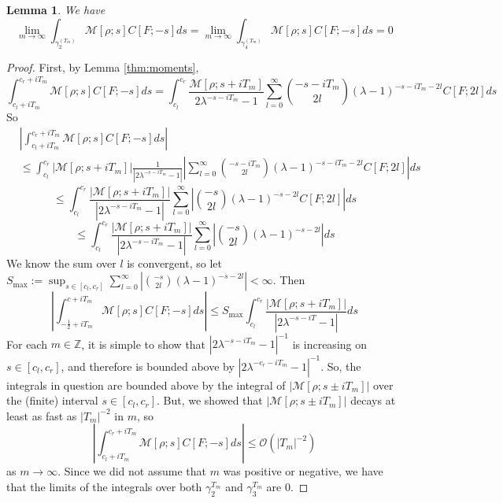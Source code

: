 \documentclass{article}
\newtheorem{lemma}{Lemma}
\newcommand{\tti}{\rightarrow\infty}
\newcommand{\bigO}[1]{\mathcal{O}\left(#1\right)}
\begin{document}
\begin{lemma}
    We have
    \begin{equation}
        \lim_{m \tti}\int_{\gamma_2^{(T_m)}}\mathcal{M}[\rho;s]C[F;-s]ds = \lim_{m \tti}\int_{\gamma_4^{(T_m)}}\mathcal{M}[\rho;s]C[F;-s]ds = 0
    \end{equation}
\end{lemma}
\begin{proof}
    First, by Lemma \ref{thm:moments},
    \begin{equation}
        \int_{c_l+iT_m}^{c_r+iT_m} \mathcal{M}[\rho;s]C[F;-s]ds = \int_{c_l}^{c_r} \frac{\mathcal{M}[\rho;s+iT_m]}{2\lambda^{-s-iT_m}-1}\sum_{l=0}^\infty \binom{-s-iT_m}{2l}(\lambda-1)^{-s-iT_m-2l} C[F; 2l]ds
    \end{equation}
    So
    \begin{align}
        &\left|\int_{c_l+iT_m}^{c_r+iT_m} \mathcal{M}[\rho;s]C[F;-s]ds\right| \nonumber \\ &\leq \int_{c_l}^{c_r} |\mathcal{M}[\rho;s+iT_m]|\frac{1}{|2\lambda^{-s-iT_m}-1|}\left|\sum_{l=0}^\infty \binom{-s-iT_m}{2l}(\lambda-1)^{-s-iT_m-2l} C[F; 2l]\right|ds
    \end{align}
    \begin{equation}
        \leq \int_{c_l}^{c_r} \frac{|\mathcal{M}[\rho;s+iT_m]|}{|2\lambda^{-s-iT_m}-1|}\sum_{l=0}^{\infty}\left|\binom{-s}{2l}(\lambda-1)^{-s-2l} C[F;2l]\right|ds
    \end{equation}
    \begin{equation}
        \leq \int_{c_l}^{c_r} \frac{|\mathcal{M}[\rho;s+iT_m]|}{|2\lambda^{-s-iT_m}-1|}\sum_{l=0}^{\infty}\left|\binom{-s}{2l}(\lambda-1)^{-s-2l}\right| ds
    \end{equation}
    We know the sum over $l$ is convergent, so let $S_{\max} := \sup_{s \in [c_l, c_r]} \sum_{l=0}^{\infty} \left|\binom{-s}{2l}(\lambda-1)^{-s-2l}\right| < \infty$.
    Then
    \begin{equation}
        \left|\int_{-\frac{1}{2}+iT_m}^{c+iT_m} \mathcal{M}[\rho;s]C[F;-s]ds\right| \leq S_{\max}\int_{c_l}^{c_r} \frac{|\mathcal{M}[\rho;s+iT_m]|}{|2\lambda^{-s-iT}-1|}ds
    \end{equation}
    For each $m\in\mathbb{Z}$, it is simple to show that $|2\lambda^{-s-iT_m}-1|^{-1}$ is increasing on $s\in[c_l,c_r]$, and therefore is bounded above by $|2\lambda^{-c_r-iT_m}-1|^{-1}$. So, the integrals in question are bounded above by the integral of $|\mathcal{M}[\rho; s \pm iT_m]|$ over the (finite) interval $s \in [c_l, c_r]$. But, we showed that $|\mathcal{M}[\rho; s\pm iT_m]|$ decays at least as fast as $|T_m|^{-2}$ in $m$, so
    \begin{equation}
        \left|\int_{c_l+iT_m}^{c_r+iT_m} \mathcal{M}[\rho;s]C[F;-s]ds\right| \leq \bigO{|T_m|^{-2}}
    \end{equation}
    as $m\tti$. Since we did not assume that $m$ was positive or negative, we have that the limits of the integrals over both $\gamma_2^{T_m}$ and $\gamma_3^{T_m}$ are 0.
\end{proof}
\end{document}
